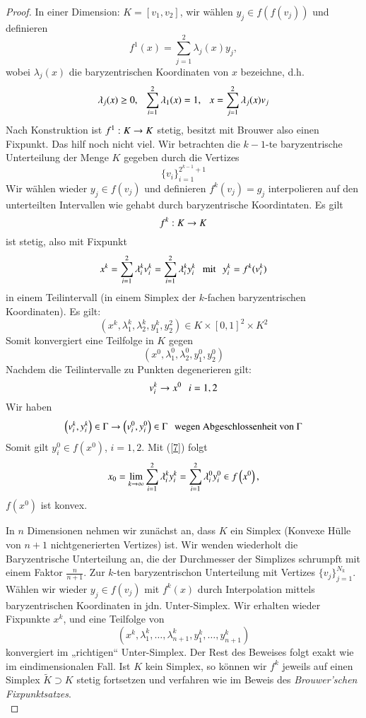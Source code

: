 \begin{proof}
    In einer Dimension: $K=[v_1,v_2]$, wir wählen $y_j\in f(f(v_j))$ und definieren
    \[
        f^1(x)=\sum_{j=1}^{2} \lambda_j(x)y_j,
    \]
    wobei $\lambda _j(x)$ die baryzentrischen Koordinaten von $x$ bezeichne, d.h.
    \[
        \lambda_j(x)\geq 0, \hspace{.25cm} \sum_{i=1}^2 \lambda_1(x)=1,\hspace{.25cm} x=\sum_{j=1}^2 \lambda_j(x)v_j
    \]
    Nach Konstruktion ist $f^1:K\rightarrow K$ stetig, besitzt mit Brouwer also einen Fixpunkt. Das hilf
    noch nicht viel. Wir betrachten die $k-1$-te baryzentrische Unterteilung der Menge $K$ gegeben
    durch die Vertizes 
    \[
        \{v_i\}_{i=1}^{2^{k-1}+1}
    \]
    Wir wählen wieder $y_j\in f(v_j)$ und definieren $f^k(v_j)=g_j$ interpolieren auf den unterteilten
    Intervallen wie gehabt durch baryzentrische Koordintaten. Es gilt
    \[
        f^k: K\rightarrow K
    \] 
    ist stetig, also mit Fixpunkt
    \begin{align}\label{7}
        x^k=\sum_{i=1}^2 \lambda_i^kv_i^k= \sum_{i=1}^2 \lambda_i^ky_i^k \hspace{.25cm} \text{mit} \hspace{.25cm} 
        y_i^k=f^k(v_i^k)
    \end{align}
    in einem Teilintervall  (in einem Simplex der $k$-fachen baryzentrischen Koordinaten). Es gilt:
    \[
        \left(x^k,\lambda_1^k,\lambda_2^k,y_1^k,y_2^2\right)\in K\times[0,1]^2\times K^2
    \]
    Somit konvergiert eine Teilfolge in $K$ gegen
    \[
        \left(x^0,\lambda_1^0,\lambda_2^0,y_1^0,y_2^0\right)
    \]
    Nachdem die Teilintervalle zu Punkten degenerieren gilt:
    \[
        v_i^k\rightarrow x^0 \hspace{.25cm} i=1,2
    \]
    Wir haben 
    \[
        \left(v_i^k,y_i^k\right)\in\Gamma\rightarrow \left(v_i^0,y_i^0\right)\in \Gamma \hspace{.25cm} 
        \text{wegen Abgeschlossenheit von }\Gamma
    \]
    Somit gilt $y_i^0\in f(x^0)$, $i=1,2$. Mit (\ref{7}) folgt
    \[
        x_0 =\lim_{k\rightarrow\infty} \sum_{i=1}^2\lambda_i^ky_i^k=\sum_{i=1}^2 \lambda^0_iy_i^0 
        \in f\left(x^0\right),
    \]
    $f\left(x^0\right)$ ist konvex. 

    In $n$ Dimensionen nehmen wir zunächst an, dass $K$ ein Simplex (Konvexe Hülle von $n+1$
    nichtgenerierten Vertizes) ist. Wir wenden wiederholt die Baryzentrische Unterteilung an,
    die der Durchmesser der Simplizes schrumpft mit einem Faktor $\frac{n}{n+1}$.
    Zur $k$-ten baryzentrischon Unterteilung mit Vertizes $\{v_j\}_{j=1}^{N_k}$. Wählen wir wieder
    $y_j\in f(v_j)$ mit $f^k(x)$ durch Interpolation mittels baryzentrischen Koordinaten in jdn.
    Unter-Simplex. Wir erhalten wieder Fixpunkte $x^k$, und eine Teilfolge von
    \[
        (x^k,\lambda_1^k,…,\lambda_{n+1}^k,y_1^k,…,y_{n+1}^k)
    \]
    konvergiert im „richtigen“ Unter-Simplex. Der Rest des Beweises folgt exakt wie im eindimensionalen
    Fall. Ist $K$ kein Simplex, so können wir $f^k$ jeweils auf einen Simplex $\tilde K\supset K$ stetig
    fortsetzen und verfahren wie im Beweis des \textit{Brouwer'schen Fixpunktsatzes}.
    \[ \]
\end{proof}

